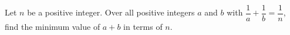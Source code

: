 Let $n$ be a positive integer. Over all positive integers $a$ and $b$ with $\dfrac{1}{a}+\dfrac{1}{b}=\dfrac{1}{n}$, find the minimum value of $a+b$ in terms of $n$.
